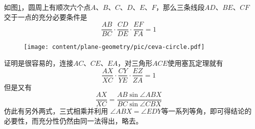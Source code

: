 \begin{example}
  如图\ref{fig:ceva-circle}，圆周上有顺次六个点$A$、$B$、$C$、$D$、$E$、$F$，那么三条线段$AD$、$BE$、$CF$交于一点的充分必要条件是
  \begin{equation*}
    \frac{AB}{BC} \cdot \frac{CD}{DE} \cdot \frac{EF}{FA} = 1
  \end{equation*}
 
\begin{figure}[htbp]
\centering
\texttt{[image: content/plane-geometry/pic/ceva-circle.pdf]}
\caption{}
\label{fig:ceva-circle}
\end{figure}

证明是很容易的，连接$AC$、$CE$、$EA$，对三角形$ACE$使用塞瓦定理就有
\begin{equation*}
  \frac{AX}{XC} \cdot \frac{CY}{YE} \cdot \frac{EZ}{ZA} = 1
\end{equation*}
但是又有
\begin{equation*}
  \frac{AX}{XC} = \frac{AB \sin{\angle ABX}}{BC \sin{\angle CBX}}
\end{equation*}
仿此有另外两式，三式相乘并利用 $\angle ABX = \angle EDY$等一系列等角，即可得结论的必要性，而充分性仍然由同一法得出，略去。
\end{example}

